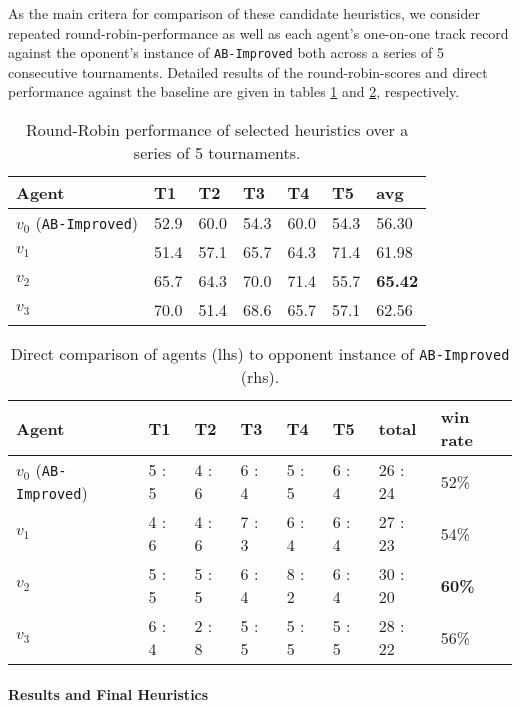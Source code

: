 \documentclass{article}
\theoremstyle{plain}
\theoremstyle{definition}
\theoremstyle{remark}
\begin{document}
As the main critera for comparison of these candidate heuristics, we consider repeated round-robin-performance as well as each agent's one-on-one track record against the oponent's instance of \texttt{AB-Improved} \textendash both across a series of 5 consecutive tournaments. Detailed results of the round-robin-scores and direct performance against the baseline are given in tables \ref{table1} and \ref{table2}, respectively.


\begin{table}[h]
\centering
\caption{Round-Robin performance of selected heuristics over a series of 5 tournaments.}
\label{table1}
\begin{tabular}{l|lllll|l}
Agent          			     & T1   & T2   & T3   & T4   & T5   &  avg \\ \hline
$v_0$ (\texttt{AB-Improved}) & 52.9 & 60.0 & 54.3 & 60.0 & 54.3 &  56.30  \\
$v_1 $        			     & 51.4 & 57.1 & 65.7 & 64.3 & 71.4 &  61.98    \\
$v_2$          			     & 65.7 & 64.3 & 70.0 & 71.4 & 55.7 &  \textbf{65.42}    \\
$v_3$           		     & 70.0 & 51.4 & 68.6 & 65.7 & 57.1 &  62.56   
\end{tabular}
\end{table}


\begin{table}[h]
\centering
\caption{Direct comparison of agents (lhs) to opponent instance of \texttt{AB-Improved} (rhs).}
\label{table2}
\begin{tabular}{l|lllll|ll}
Agent          			     & T1   & T2   & T3   & T4   & T5   &  total  & win rate\\ \hline
$v_0$ (\texttt{AB-Improved}) & 5 : 5 & 4 : 6 & 6 : 4 & 5 : 5 & 6 : 4 &  26 : 24 & 52\%\\
$v_1 $        			     & 4 : 6 & 4 : 6 & 7 : 3 & 6 : 4 & 6 : 4 &  27 : 23 & 54\%   \\
$v_2$          			     & 5 : 5 & 5 : 5 & 6 : 4 & 8 : 2 & 6 : 4 &  30 : 20 & \textbf{60\%}  \\
$v_3$           		     & 6 : 4 & 2 : 8 & 5 : 5 & 5 : 5 & 5 : 5 &  28 : 22 & 56\% 
\end{tabular}
\end{table}

\paragraph{Results and Final Heuristics}
\end{document}
